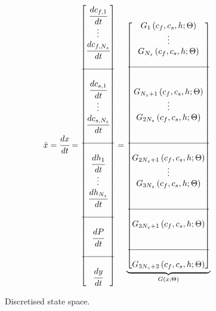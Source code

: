 \documentclass[a4paper,fleqn]{cas-dc}
\begin{document}
		\begin{figure}[!h]
			\centering
			{\footnotesize
				\begin{align*}
					\dot{x} &= \cfrac{d x}{d t} = 
					\begin{bmatrix}
						\cfrac{d c_{f,1}}{d t} 	  \\
						\vdots					  \\
						\cfrac{d c_{f,N_z}}{d t} \\
						\\ \hline \\
						\cfrac{d c_{s,1}}{d t} 	  \\
						\vdots					  \\
						\cfrac{d c_{s,N_z}}{d t} \\
						\\ \hline \\
						\cfrac{d h_1}{d t} 	  \\
						\vdots 					  \\
						\cfrac{d h_{N_z}}{d t} \\
						\\ \hline \\
						\cfrac{d P}{d t} \\
						\\ \hline \\
						\cfrac{d y}{d t}
					\end{bmatrix}
					=
					\underbrace{\begin{bmatrix}
							G_1 \left( c_f,c_s,h; \Theta \right)\\ 
							\vdots\\ 
							G_{N_z} \left( c_f,c_s,h; \Theta \right)\\ 
							\\ \hline \\ \\
							G_{N_z+1} \left( c_f,c_s,h; \Theta \right)\\ 
							\vdots\\
							G_{2N_z} \left( c_f,c_s,h; \Theta \right)\\ 
							\\ \\ \hline \\ 
							G_{2N_z+1} \left( c_f,c_s,h; \Theta \right) \\
							\vdots\\
							G_{3N_z} \left( c_f,c_s,h; \Theta \right) \\ 
							\\ \\ \hline \\
							G_{3N_z+1} \left( c_f,c_s,h; \Theta \right) \\
							\\ \\ \hline \\
							G_{3N_z+2} \left( c_f,c_s,h; \Theta \right) 
					\end{bmatrix}}_{G \left( x; \Theta \right)} 
			\end{align*} }
			\caption{Discretised state space.}
			\label{fig:discretization}
		\end{figure}
		
\end{document}
